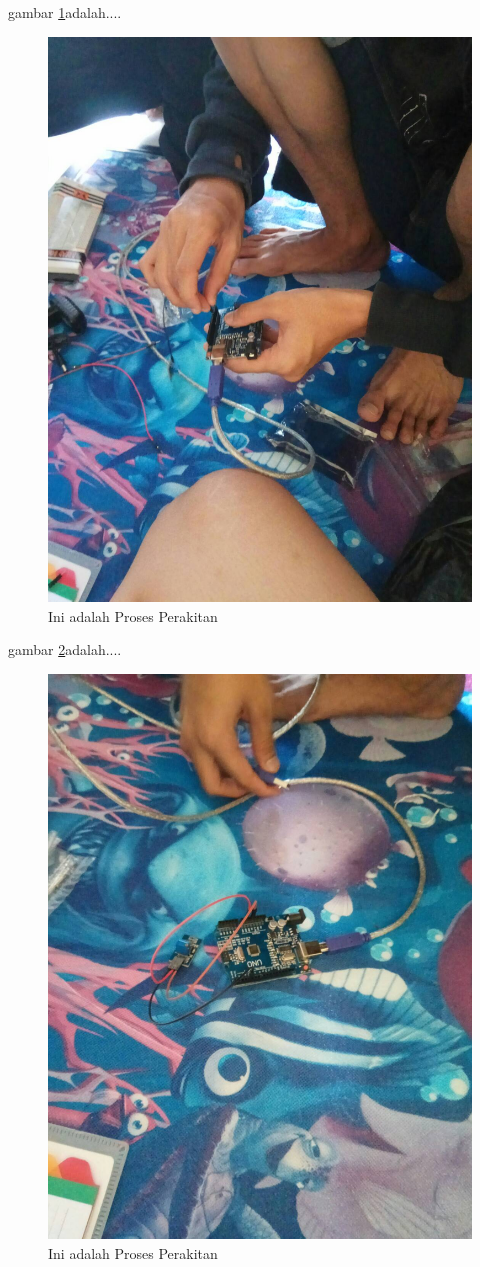   gambar \ref{ar3}adalah....
  \begin{figure}[ht]
  \centerline{\includegraphics[width=.75\textwidth]{figures/ar3.jpg}}
  \caption{Ini adalah Proses Perakitan}
  \label{ar3}
  \end{figure}

  gambar \ref{ar4}adalah....
  \begin{figure}[ht]
  \centerline{\includegraphics[width=.75\textwidth]{figures/ar4.jpg}}
  \caption{Ini adalah Proses Perakitan}
  \label{ar4}
  \end{figure}

